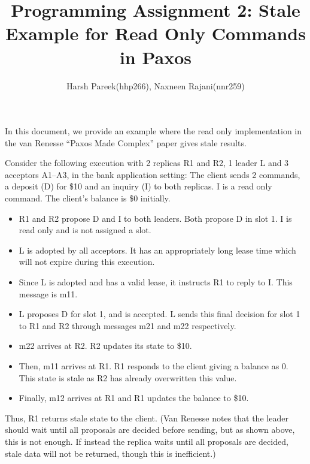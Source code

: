 \documentclass{article}
\title{ Programming Assignment 2: Stale Example for Read Only Commands in Paxos}
\author{ Harsh Pareek(hhp266), Naxneen Rajani(nnr259)}
\begin{document}
\maketitle

In this document, we provide an example where the read only implementation in the van Renesse ``Paxos Made Complex'' paper gives stale results.

Consider the following execution with 2 replicas R1 and R2, 1 leader L and 3 acceptors A1--A3, in the bank application setting:
The client sends 2 commands, a deposit (D) for \$10 and an inquiry (I) to both replicas. I is a read only command. The client's balance is \$0 initially.

\begin{itemize}
\item R1 and R2 propose D and I to both leaders. Both propose D in slot 1. I is read only and is not assigned a slot.
\item L is adopted by all acceptors. It has an appropriately long lease time which will not expire during this execution.
\item Since L is adopted and has a valid lease, it instructs R1 to reply to I. This message is m11.
\item L proposes D for slot 1, and is accepted. L sends this final decision for slot 1 to R1 and R2 through messages m21 and m22 respectively.
\item m22 arrives at R2. R2 updates its state to \$10.
\item Then, m11 arrives at R1. R1 responds to the client giving a balance as 0. This state is stale as R2 has already overwritten this value.
\item Finally, m12 arrives at R1 and R1 updates the balance to \$10.
\end{itemize}

Thus, R1 returns stale state to the client. (Van Renesse notes that the leader should wait until all proposals are decided before sending, but as shown above, this is not enough. If instead the replica waits until all proposals are decided, stale data will not be returned, though this is inefficient.)
\end{document}
